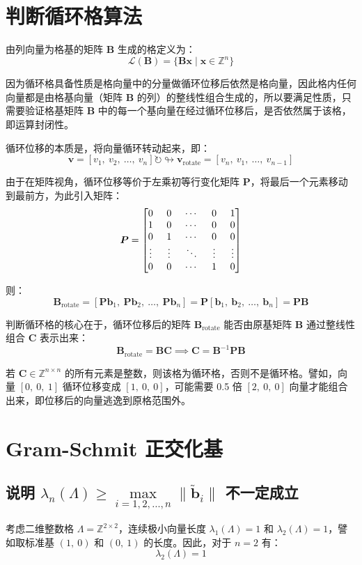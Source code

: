 \documentclass{article}
\begin{document}
\section{判断循环格算法}
由列向量为格基的矩阵 $\bm{B}$ 生成的格定义为：
\[ \mathcal{L}(\bm{B})=\{\bm{B}\bm{x}\mid\bm{x}\in\mathbb{Z}^{n}\} \]

因为循环格具备性质是格向量中的分量做循环位移后依然是格向量，因此格内任何向量都是由格基向量（矩阵 $\bm{B}$ 的列）的整线性组合生成的，所以要满足性质，只需要验证格基矩阵 $\bm{B}$ 中的每一个基向量在经过循环位移后，是否依然属于该格，即运算封闭性。

循环位移的本质是，将向量循环转动起来，即：
\[ \bm{v}=[v_1,\ v_2,\ \ldots,\ v_n]\circlearrowright\looparrowright\bm{v}_{\text{rotate}}=[v_n,\ v_1,\ \ldots,\ v_{n-1}] \]

由于在矩阵视角，循环位移等价于左乘初等行变化矩阵 $\bm{P}$，将最后一个元素移动到最前方，为此引入矩阵：
\[ \setlength{\arraycolsep}{7pt}\bm{P}=\left[\begin{matrix}
    0 & 0 & \cdots & 0 & 1 \\
    1 & 0 & \cdots & 0 & 0 \\
    0 & 1 & \cdots & 0 & 0 \\
    \vdots & \vdots & \ddots & \vdots & \vdots \\
    0 & 0 & \cdots & 1 & 0 \\
\end{matrix}\right] \]

则：
\[ \bm{B}_{\text{rotate}}=[\bm{P}\bm{b}_1,\ \bm{P}\bm{b}_2,\ \ldots,\ \bm{P}\bm{b}_n]=\bm{P}[\bm{b}_1,\ \bm{b}_2,\ \ldots,\ \bm{b}_n]=\bm{P}\bm{B} \]

判断循环格的核心在于，循环位移后的矩阵 $\bm{B}_{\text{rotate}}$ 能否由原基矩阵 $\bm{B}$ 通过整线性组合 $\bm{C}$ 表示出来：
\[ \bm{B}_{\text{rotate}}=\bm{B}\bm{C}\implies \bm{C}=\bm{B}^{-1}\bm{P}\bm{B} \]

若 $\bm{C}\in\mathbb{Z}^{n\times n}$ 的所有元素是整数，则该格为循环格，否则不是循环格。譬如，向量 $[0,\ 0,\ 1]$ 循环位移变成 $[1,\ 0,\ 0]$，可能需要 0.5 倍 $[2,\ 0,\ 0]$ 向量才能组合出来，即位移后的向量逃逸到原格范围外。



\section{Gram-Schmit 正交化基}
\subsection{说明 $\lambda_n(\Lambda)\geqslant\max\limits_{i=1,2,\ldots,n}\|\tilde{\bm{b}}_i\|$ 不一定成立}
考虑二维整数格 $\Lambda=\mathbb{Z}^{2\times2}$，连续极小向量长度 $\lambda_1(\Lambda)=1$ 和 $\lambda_2(\Lambda)=1$，譬如取标准基 $(1,\ 0)$ 和 $(0,\ 1)$ 的长度。因此，对于 $n=2$ 有：
\[ \lambda_2(\Lambda)=1 \]
\end{document}
